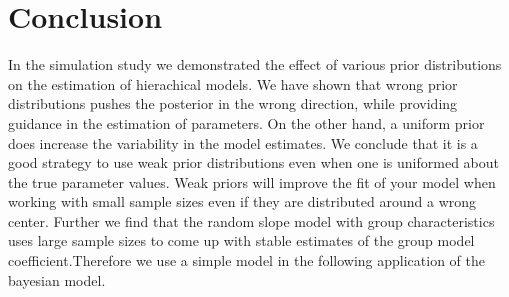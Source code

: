 \section{Conclusion}




In the simulation study we demonstrated the effect of various prior distributions on the estimation of hierachical models. 
We have shown that wrong prior distributions pushes the posterior in the wrong direction, while providing guidance in the estimation of parameters. On the other hand, a uniform prior does increase the variability in the model estimates. 
We conclude that it is a good strategy to use weak prior distributions even when one is uniformed about the true parameter values. Weak priors will improve the fit of your model when working with small sample sizes even if they are distributed around a wrong center.
Further we find that the random slope model with group characteristics uses large sample sizes to come up with stable estimates of the group model coefficient.Therefore we use a simple model in the following application of the bayesian model.